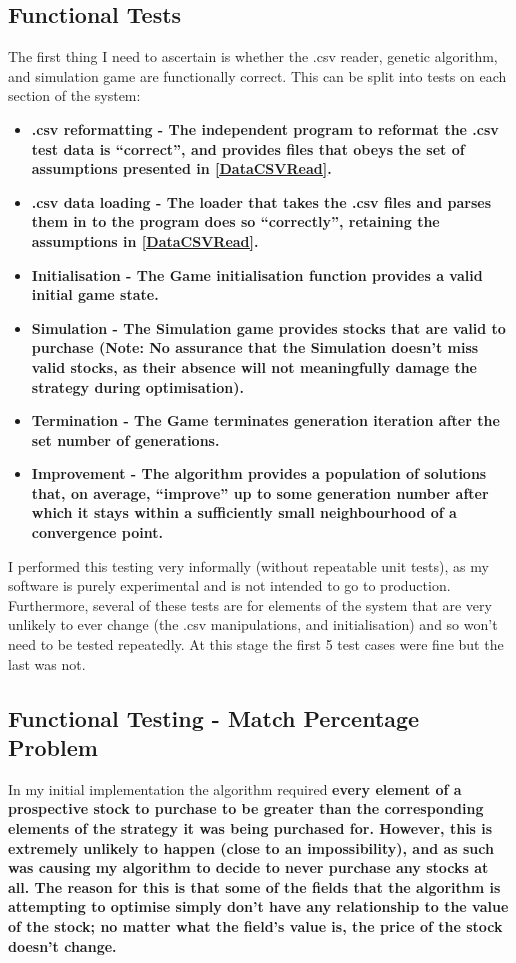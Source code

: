 \subsection{Functional Tests}
The first thing I need to ascertain is whether the .csv reader, genetic algorithm, and simulation game are functionally correct. This can be split into tests on each section of the system:
\begin{itemize}
    \item \bf .csv reformatting \rm - The independent program to reformat the .csv test data is ``correct'', and provides files that obeys the set of assumptions presented in \ref{DataCSVRead}.
    \item \bf .csv data loading \rm - The loader that takes the .csv files and parses them in to the program does so ``correctly'', retaining the assumptions in \ref{DataCSVRead}.
    \item \bf Initialisation \rm - The Game initialisation function provides a valid initial game state.
    \item \bf Simulation \rm - The Simulation game provides stocks that are valid to purchase (Note: No assurance that the Simulation doesn't miss valid stocks, as their absence will not meaningfully damage the strategy during optimisation).
    \item \bf Termination \rm - The Game terminates generation iteration after the set number of generations.
    \item \bf Improvement \rm - The algorithm provides a population of solutions that, on average, ``improve'' up to some generation number after which it stays within a sufficiently small neighbourhood of a convergence point.
\end{itemize}

I performed this testing very informally (without repeatable unit tests), as my software is purely experimental and is not intended to go to production. Furthermore, several of these tests are for elements of the system that are very unlikely to ever change (the .csv manipulations, and initialisation) and so won't need to be tested repeatedly. At this stage the first 5 test cases were fine but the last was not.

\subsection{Functional Testing - Match Percentage Problem} \label{testingConsequences}
In my initial implementation the algorithm required \bf every \rm element of a prospective stock to purchase to be greater than the corresponding elements of the strategy it was being purchased for. However, this is extremely unlikely to happen (close to an impossibility), and as such was causing my algorithm to decide to never purchase any stocks at all. The reason for this is that some of the fields that the algorithm is attempting to optimise simply don't have any relationship to the value of the stock; no matter what the field's value is, the price of the stock doesn't change. \newline


